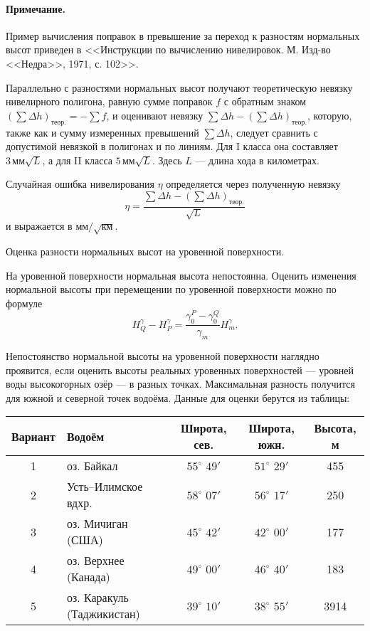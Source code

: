 \documentclass[11pt, a4paper,addpoints]{exam}
\theoremstyle{remark}
\begin{document}
\begin{questions}
    \paragraph{Примечание.} Пример вычисления поправок в превышение за переход к разностям нормальных высот приведен в
    <<Инструкции по вычислению нивелировок. М. Изд-во <<Недра>>, 1971, с. 102>>.

    Параллельно с разностями нормальных высот получают теоретическую невязку нивелирного полигона,
    равную сумме поправок $f$ с обратным знаком $(\sum\Delta h)_\textrm{теор.} =  -\sum f$, и
    оценивают невязку $\sum\Delta h - (\sum\Delta h)_\textrm{теор.}$, которую, также как и сумму
    измеренных превышений $\sum\Delta h$, следует сравнить с 
    допустимой невязкой в полигонах и по линиям. Для I класса она составляет 
    $3\,\textrm{мм}\sqrt{L}$, 
    а для II класса $5\,\textrm{мм}\sqrt{L}$. Здесь $L$ --- длина хода в километрах.

    Случайная ошибка нивелирования $\eta$ определяется через полученную невязку
    \begin{equation*}
        \eta = \dfrac{\sum\Delta h - (\sum\Delta h)_\textrm{теор.}}{\sqrt{L}}
    \end{equation*}
    и выражается в $\textrm{мм} / \sqrt{\textrm{км}}$.

    \question Оценка разности нормальных высот на уровенной поверхности.

    На уровенной поверхности нормальная высота непостоянна. Оценить изменения нормальной высоты при
    перемещении по уровенной поверхности можно по формуле
    \begin{equation*}
        H_Q^\gamma - H_P^\gamma = \dfrac{\gamma_0^P - \gamma_0^Q}{\gamma_m} H_m^\gamma.
    \end{equation*}

    Непостоянство нормальной высоты на уровенной поверхности наглядно проявится, если оценить высоты
    реальных уровенных поверхностей --- уровней воды высокогорных озёр --- в разных точках.
    Максимальная разность получится для южной  и северной точек водоёма. Данные для оценки берутся
    из таблицы:
    \begin{table}[H]
        \centering
        \begin{tabular}{|c|l|c|c|c|}
            \hline
            Вариант & Водоём & Широта, сев. & Широта, южн. & Высота, м \\\hline
            1 & оз. Байкал & $55^\circ$ $49'$ & $51^\circ$ $29'$ & 455 \\ 
            2 & Усть--Илимское вдхр. & $58^\circ$ $07'$ & $56^\circ$ $17'$ & 250 \\ 
            3 & оз. Мичиган (США) & $45^\circ$ $42'$ & $42^\circ$ $00'$ & 177 \\ 
            4 & оз. Верхнее (Канада) & $49^\circ$ $00'$ & $46^\circ$ $40'$ & 183 \\ 
            5 & оз. Каракуль (Таджикистан) & $39^\circ$ $10'$ & $38^\circ$ $55'$ & 3914 \\ 
            \hline
        \end{tabular}
    \end{table}

\end{questions}
\end{document}
